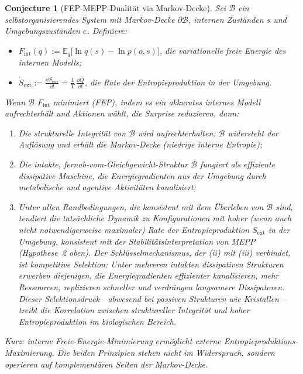 \documentclass[12pt,a4paper]{article}
\newtheorem{conjecture}{Conjecture}
\theoremstyle{remark}
\begin{document}
\begin{conjecture}[FEP-MEPP-Dualit\"at via Markov-Decke]
\label{prop:fep-mepp}
Sei $\mathcal{B}$ ein selbstorganisierendes System mit Markov-Decke $\partial\mathcal{B}$, internen Zust\"anden $s$ und Umgebungszust\"anden $e$. Definiere:
\begin{itemize}
  \item $F_{\mathrm{int}}(q) :=
    \mathbb{E}_{q}\!\bigl[\ln q(s) - \ln p(o, s)\bigr]$,
    die variationelle freie Energie des internen Modells;
  \item $\dot{S}_{\mathrm{ext}} :=
    \frac{\dd S_{\mathrm{env}}}{\dd t} =
    \frac{1}{T}\,\frac{\dd Q}{\dd t}$,
    die Rate der Entropieproduktion in der Umgebung.
\end{itemize}
Wenn $\mathcal{B}$ $F_{\mathrm{int}}$ minimiert (FEP), indem es ein akkurates internes Modell aufrechterh\"alt und Aktionen w\"ahlt, die Surprise reduzieren, dann:
\begin{enumerate}
  \item[\emph{(i)}] Die strukturelle Integrit\"at von $\mathcal{B}$ wird aufrechterhalten: $\mathcal{B}$ widersteht der Aufl\"osung und erh\"alt die Markov-Decke (niedrige interne Entropie);
  \item[\emph{(ii)}] Die intakte, fernab-vom-Gleichgewicht-Struktur $\mathcal{B}$ fungiert als effiziente dissipative Maschine, die Energiegradienten aus der Umgebung durch metabolische und agentive Aktivit\"aten kanalisiert;
  \item[\emph{(iii)}] Unter allen Randbedingungen, die konsistent mit dem \"Uberleben von $\mathcal{B}$ sind, tendiert die tats\"achliche Dynamik zu Konfigurationen mit hoher (wenn auch nicht notwendigerweise maximaler) Rate der Entropieproduktion $\dot{S}_{\mathrm{ext}}$ in der Umgebung, konsistent mit der Stabilit\"atsinterpretation von MEPP (Hypothese~2 oben). Der Schl\"usselmechanismus, der (ii) mit (iii) verbindet, ist \emph{kompetitive Selektion}: Unter mehreren intakten dissipativen Strukturen erwerben diejenigen, die Energiegradienten effizienter kanalisieren, mehr Ressourcen, replizieren schneller und verdr\"angen langsamere Dissipatoren. Dieser Selektionsdruck---abwesend bei passiven Strukturen wie Kristallen---treibt die Korrelation zwischen struktureller Integrit\"at und hoher Entropieproduktion im biologischen Bereich.
\end{enumerate}
Kurz: \emph{interne Freie-Energie-Minimierung erm\"oglicht externe Entropieproduktions-Maximierung}. Die beiden Prinzipien stehen nicht im Widerspruch, sondern operieren auf komplement\"aren Seiten der Markov-Decke.
\end{conjecture}
\end{document}
